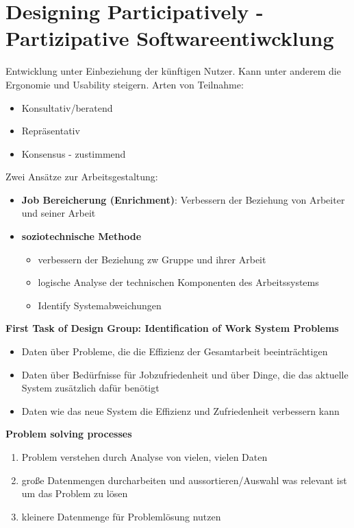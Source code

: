 \section{Designing Participatively - Partizipative Softwareentiwcklung}
Entwicklung unter Einbeziehung der künftigen Nutzer. Kann unter anderem die Ergonomie und Usability steigern.
Arten von Teilnahme:
\begin{itemize}
	\item Konsultativ/beratend
	\item Repräsentativ
	\item Konsensus - zustimmend
\end{itemize}
Zwei Ansätze zur Arbeitsgestaltung:
\begin{itemize}
	\item \textbf{Job Bereicherung (Enrichment)}: Verbessern der Beziehung von Arbeiter und seiner Arbeit
	\item \textbf{soziotechnische Methode}
	\begin{itemize}
		\item verbessern der Beziehung zw Gruppe und ihrer Arbeit
		\item logische Analyse der technischen Komponenten des Arbeitssystems
		\item Identify Systemabweichungen
	\end{itemize}
\end{itemize}

\textbf{First Task of Design Group: Identification of Work System Problems}
\begin{itemize}
	\item Daten über Probleme, die die Effizienz der Gesamtarbeit beeinträchtigen
	\item Daten über Bedürfnisse für Jobzufriedenheit und über Dinge, die das aktuelle System zusätzlich dafür benötigt
	\item Daten wie das neue System die Effizienz und Zufriedenheit verbessern kann
\end{itemize}

\textbf{Problem solving processes}
\begin{enumerate}
	\item Problem verstehen durch Analyse von vielen, vielen Daten
	\item große Datenmengen durcharbeiten und aussortieren/Auswahl was relevant ist um das Problem zu lösen
	\item kleinere Datenmenge für Problemlösung nutzen
\end{enumerate}

